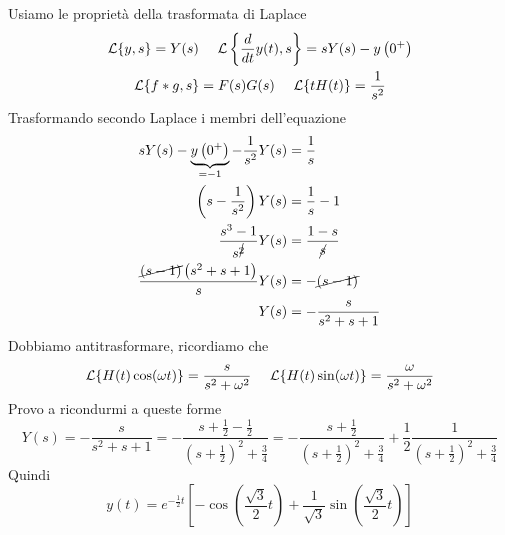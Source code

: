 Usiamo le proprietà della trasformata di Laplace
\begin{gather*}
\mathcal{L}\{y, s\} = Y(s) \ \ \ \ \mathcal{L}\left\{\frac{d}{dt} y(t), s\right\} = sY(s) - y\left(0^{+}\right)\\
\mathcal{L}\{f*g, s\} = F(s) G(s) \ \ \ \ \mathcal{L}\{tH(t)\} = \frac{1}{s^{2}}
\end{gather*}
Trasformando secondo Laplace i membri dell'equazione
\begin{align*}
sY(s) - \underbrace{y\left(0^{+}\right)}_{= -1} - \frac{1}{s^{2}} Y(s) & = \frac{1}{s}\\
\left(s - \frac{1}{s^{2}}\right) Y(s) & = \frac{1}{s} - 1\\
\frac{s^{3} - 1}{s^{\cancel{2}}} Y(s) & = \frac{1 - s}{\cancel{s}}\\
\frac{\cancel{(s - 1)}\left(s^{2} + s + 1\right)}{s} Y(s) & = - \cancel{(s - 1)}\\
Y(s) & = - \frac{s}{s^{2} + s + 1}
\end{align*}
Dobbiamo antitrasformare, ricordiamo che
\begin{equation*}
\mathcal{L}\{H(t)\cos(\omega t)\} = \frac{s}{s^{2} + \omega^{2}} \ \ \ \ \mathcal{L}\{H(t)\sin(\omega t)\} = \frac{\omega}{s^{2} + \omega^{2}}
\end{equation*}
Provo a ricondurmi a queste forme
\begin{equation*}
Y(s) = - \frac{s}{s^{2} + s + 1} = - \frac{s + \frac{1}{2} - \frac{1}{2}}{\left(s + \frac{1}{2}\right)^{2} + \frac{3}{4}} = - \frac{s + \frac{1}{2}}{\left(s + \frac{1}{2}\right)^{2} + \frac{3}{4}} + \frac{1}{2}\frac{1}{\left(s + \frac{1}{2}\right)^{2} + \frac{3}{4}}
\end{equation*}
Quindi
\begin{equation*}
y(t) = e^{- \frac{1}{2} t}\left[ - \cos\left(\frac{\sqrt{3}}{2} t\right) + \frac{1}{\sqrt{3}}\sin\left(\frac{\sqrt{3}}{2} t\right)\right]
\end{equation*}

\Soluzione

